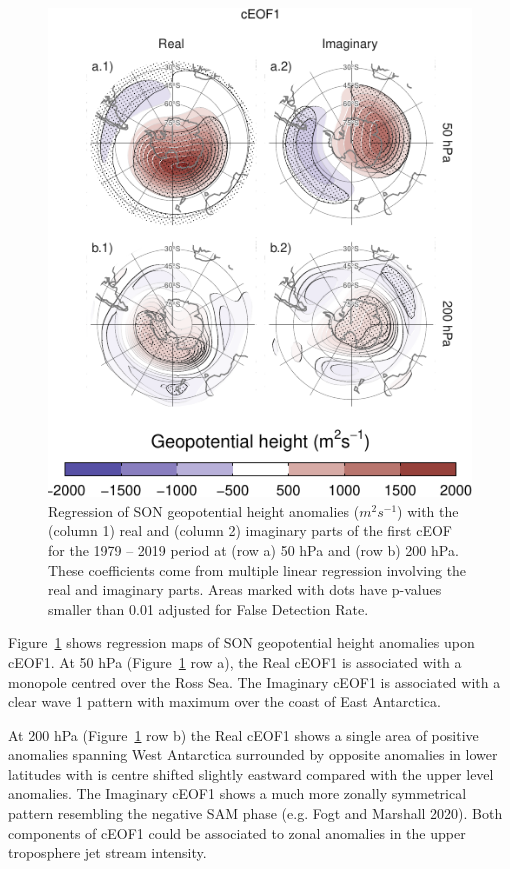 \documentclass[smallextended]{svjour3}       %
\begin{document}
\begin{figure}
\centering
\includegraphics{../figures/eof1-regr-gh-1.pdf}
\caption{\label{fig:eof1-regr-gh}Regression of SON geopotential height anomalies (\(m^2s^{-1}\)) with the (column 1) real and (column 2) imaginary parts of the first cEOF for the 1979 -- 2019 period at (row a) 50 hPa and (row b) 200 hPa. These coefficients come from multiple linear regression involving the real and imaginary parts. Areas marked with dots have p-values smaller than 0.01 adjusted for False Detection Rate.}
\end{figure}

Figure~\ref{fig:eof1-regr-gh} shows regression maps of SON geopotential height anomalies upon cEOF1.
At 50 hPa (Figure~\ref{fig:eof1-regr-gh} row a), the Real cEOF1 is associated with a monopole centred over the Ross Sea.
The Imaginary cEOF1 is associated with a clear wave 1 pattern with maximum over the coast of East Antarctica.

At 200 hPa (Figure~\ref{fig:eof1-regr-gh} row b) the Real cEOF1 shows a single area of positive anomalies spanning West Antarctica surrounded by opposite anomalies in lower latitudes with is centre shifted slightly eastward compared with the upper level anomalies.
The Imaginary cEOF1 shows a much more zonally symmetrical pattern resembling the negative SAM phase (e.g. Fogt and Marshall 2020).
Both components of cEOF1 could be associated to zonal anomalies in the upper troposphere jet stream intensity.
\end{document}
